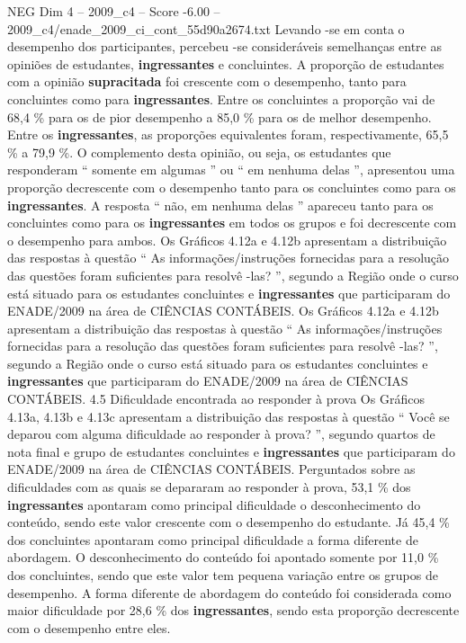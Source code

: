 \begin{textsample}{NEG Dim 4 – 2009\_c4 – Score -6.00 – 2009\_c4/enade\_2009\_ci\_cont\_55d90a2674.txt}
Levando -se em conta o desempenho dos participantes, percebeu -se consideráveis semelhanças entre as opiniões de estudantes, \textbf{ingressantes} e concluintes.
A proporção de estudantes com a opinião \textbf{supracitada} foi crescente com o desempenho, tanto para concluintes como para \textbf{ingressantes}.
Entre os concluintes a proporção vai de 68,4 \% para os de pior desempenho a 85,0 \% para os de melhor desempenho.
Entre os \textbf{ingressantes}, as proporções equivalentes foram, respectivamente, 65,5 \% a 79,9 \%.
O complemento desta opinião, ou seja, os estudantes que responderam “ somente em algumas ” ou “ em nenhuma delas ”, apresentou uma proporção decrescente com o desempenho tanto para os concluintes como para os \textbf{ingressantes}.
A resposta “ não, em nenhuma delas ” apareceu tanto para os concluintes como para os \textbf{ingressantes} em todos os grupos e foi decrescente com o desempenho para ambos.
Os Gráficos 4.12a e 4.12b apresentam a distribuição das respostas à questão “ As informações/instruções fornecidas para a resolução das questões foram suficientes para resolvê -las? ”, segundo a Região onde o curso está situado para os estudantes concluintes e \textbf{ingressantes} que participaram do ENADE/2009 na área de CIÊNCIAS CONTÁBEIS.
Os Gráficos 4.12a e 4.12b apresentam a distribuição das respostas à questão “ As informações/instruções fornecidas para a resolução das questões foram suficientes para resolvê -las? ”, segundo a Região onde o curso está situado para os estudantes concluintes e \textbf{ingressantes} que participaram do ENADE/2009 na área de CIÊNCIAS CONTÁBEIS. 4.5 Dificuldade encontrada ao responder à prova Os Gráficos 4.13a, 4.13b e 4.13c apresentam a distribuição das respostas à questão “ Você se deparou com alguma dificuldade ao responder à prova? ”, segundo quartos de nota final e grupo de estudantes concluintes e \textbf{ingressantes} que participaram do ENADE/2009 na área de CIÊNCIAS CONTÁBEIS.
Perguntados sobre as dificuldades com as quais se depararam ao responder à prova, 53,1 \% dos \textbf{ingressantes} apontaram como principal dificuldade o desconhecimento do conteúdo, sendo este valor crescente com o desempenho do estudante.
Já 45,4 \% dos concluintes apontaram como principal dificuldade a forma diferente de abordagem.
O desconhecimento do conteúdo foi apontado somente por 11,0 \% dos concluintes, sendo que este valor tem pequena variação entre os grupos de desempenho.
A forma diferente de abordagem do conteúdo foi considerada como maior dificuldade por 28,6 \% dos \textbf{ingressantes}, sendo esta proporção decrescente com o desempenho entre eles.

\end{textsample}
